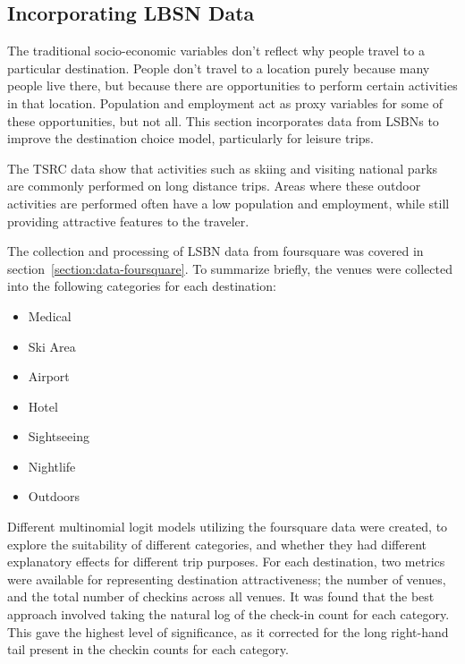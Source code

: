 \subsection{Incorporating LBSN Data}

The traditional socio-economic variables don't reflect why people travel to a particular destination. People don't travel to a location purely because many people live there, but because there are opportunities to perform certain activities in that location. Population and employment act as proxy variables for some of these opportunities, but not all. This section incorporates data from LSBNs to improve the destination choice model, particularly for leisure trips.  

The TSRC data show that activities such as skiing and visiting national parks are commonly performed on long distance trips. Areas where these outdoor activities are performed often have a low population and employment, while still providing attractive features to the traveler.

The collection and processing of LSBN data from foursquare was covered in section~\ref{section:data-foursquare}. To summarize briefly, the venues were collected into the following categories for each destination:
\begin{multicols}{2}
\raggedcolumns
\begin{itemize}
\item Medical
\item Ski Area
\item Airport
\item Hotel
\item Sightseeing
\item Nightlife
\item Outdoors
\end{itemize}
\end{multicols}


Different multinomial logit models utilizing the foursquare data were created, to explore the suitability of different categories, and whether they had different explanatory effects for different trip purposes. For each destination, two metrics were available for representing destination attractiveness; the number of venues, and the total number of checkins across all venues.
It was found that the best approach involved taking the natural log of the check-in count for each category. This gave the highest level of significance, as it corrected for the long right-hand tail present in the checkin counts for each category.


